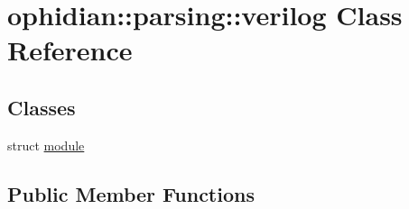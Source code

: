 \hypertarget{classophidian_1_1parsing_1_1verilog}{\section{ophidian\-:\-:parsing\-:\-:verilog Class Reference}
\label{classophidian_1_1parsing_1_1verilog}
}
\subsection*{Classes}
\begin{DoxyCompactItemize}
\item 
struct \hyperlink{structophidian_1_1parsing_1_1verilog_1_1module}{module}
\end{DoxyCompactItemize}
\subsection*{Public Member Functions}
